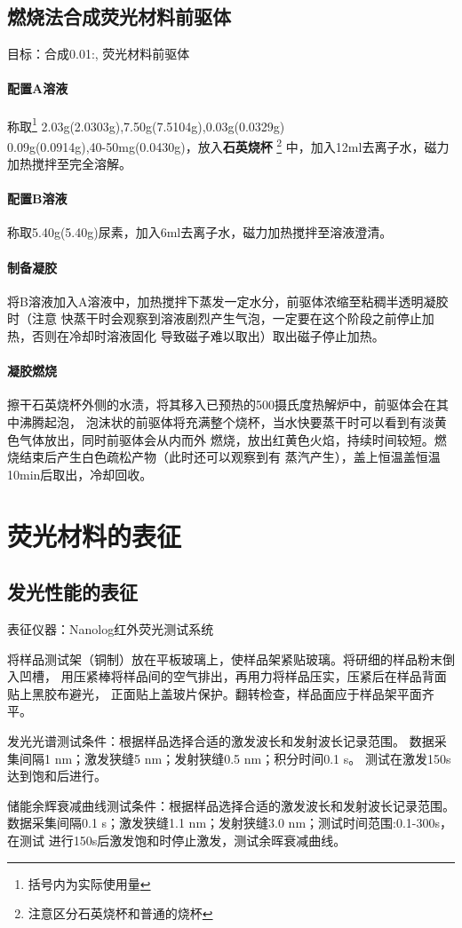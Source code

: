 \documentclass[a4paper,zihao=5,UTF8]{ctexart}
\begin{document}
	\subsection{燃烧法合成荧光材料前驱体}
	目标：合成0.01:,
	荧光材料前驱体
	\paragraph{配置A溶液}
	称取\footnote{括号内为实际使用量}
	2.03g(2.0303g),7.50g(7.5104g),0.03g(0.0329g)\\
	0.09g(0.0914g),40-50mg(0.0430g)，放入\textbf{石英烧杯}
	\footnote{注意区分石英烧杯和普通的烧杯}
	中，加入12ml去离子水，磁力加热搅拌至完全溶解。
	\paragraph{配置B溶液}
	称取5.40g(5.40g)尿素，加入6ml去离子水，磁力加热搅拌至溶液澄清。
	\paragraph{制备凝胶}
	将B溶液加入A溶液中，加热搅拌下蒸发一定水分，前驱体浓缩至粘稠半透明凝胶时（注意
	快蒸干时会观察到溶液剧烈产生气泡，一定要在这个阶段之前停止加热，否则在冷却时溶液固化
	导致磁子难以取出）取出磁子停止加热。
	\paragraph{凝胶燃烧}
	擦干石英烧杯外侧的水渍，将其移入已预热的500摄氏度热解炉中，前驱体会在其中沸腾起泡，
	泡沫状的前驱体将充满整个烧杯，当水快要蒸干时可以看到有淡黄色气体放出，同时前驱体会从内而外
	燃烧，放出红黄色火焰，持续时间较短。燃烧结束后产生白色疏松产物（此时还可以观察到有
	蒸汽产生），盖上恒温盖恒温10min后取出，冷却回收。
	\section{荧光材料的表征}
	\subsection{发光性能的表征}
	表征仪器：Nanolog红外荧光测试系统
	\par
	将样品测试架（铜制）放在平板玻璃上，使样品架紧贴玻璃。将研细的样品粉末倒入凹槽，
	用压紧棒将样品间的空气排出，再用力将样品压实，压紧后在样品背面贴上黑胶布避光，
	正面贴上盖玻片保护。翻转检查，样品面应于样品架平面齐平。
	\par
	发光光谱测试条件：根据样品选择合适的激发波长和发射波长记录范围。
	数据采集间隔1 nm；激发狭缝5 nm；发射狭缝0.5 nm；积分时间0.1 s。
	测试在激发150s达到饱和后进行。
	\par
	储能余辉衰减曲线测试条件：根据样品选择合适的激发波长和发射波长记录范围。
	数据采集间隔0.1 s；激发狭缝1.1 nm；发射狭缝3.0 nm；测试时间范围:0.1-300s，在测试
	进行150s后激发饱和时停止激发，测试余晖衰减曲线。
\end{document}
